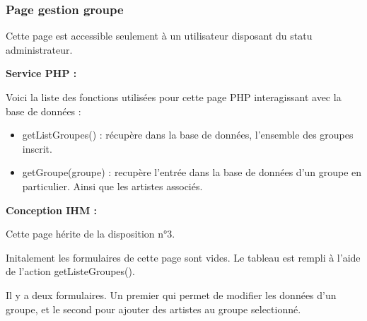 			\begin{paragraphe}
			\end{paragraphe}

		\subsubsection{Page gestion groupe}

			\begin{paragraphe}
				Cette page est accessible seulement à un utilisateur disposant du statu administrateur.
			\end{paragraphe}

			\begin{paragraphe}
				\textbf{Service PHP :}
			\end{paragraphe}

			\begin{paragraphe}
				Voici la liste des fonctions utilisées pour cette page PHP interagissant avec la base de données :
			\end{paragraphe}

			\begin{paragraphe}
				\begin{itemize}
					\item getListGroupes() : récupère dans la base de données, l'ensemble des groupes inscrit.
					\item getGroupe(groupe) : recupère l'entrée dans la base de données d'un groupe en particulier. Ainsi que les artistes associés.
				\end{itemize}
			\end{paragraphe}

			\begin{paragraphe}
				\textbf{Conception IHM :}
			\end{paragraphe}

			\begin{paragraphe}
				Cette page hérite de la disposition n°3.\par
				Initalement les formulaires de cette page sont vides.
				Le tableau est rempli à l'aide de l'action getListeGroupes().
			\end{paragraphe}


			\begin{paragraphe}
				Il y a deux formulaires. Un premier qui permet de modifier les données d'un groupe, et le second pour ajouter des artistes au groupe selectionné.
			\end{paragraphe}


